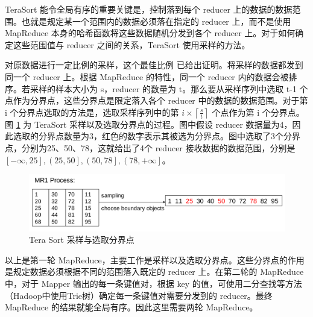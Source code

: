 TeraSort 能令全局有序的重要关键是，控制落到每个 reducer 上的数据的数据范围。也就是规定某一个范围内的数据必须落在指定的 reducer 上，而不是使用 MapReduce 本身的哈希函数将这些数据随机分发到各个 reducer 上。对于如何确定这些范围值与 reducer 之间的关系，TeraSort 使用采样的方法。

对原数据进行一定比例的采样，这个最佳比例 \cite{tao2013minimal} 已给出证明。将采样的数据都发到同一个 reducer 上。根据 MapReduce 的特性，同一个 reducer 内的数据会被排序。若采样的样本大小为 s，reducer 的数量为 t。那么要从采样序列中选取 t-1 个点作为分界点，这些分界点是限定落入各个 reducer 中的数据的数据范围。对于第 i 个分界点选取的方法是，选取采样序列中的第 $i\times \left \lceil \frac{s}{t} \right \rceil$ 个点作为第 i 个分界点。图 \ref{tera_sort_mr1} 为  TeraSort 采样以及选取分界点的过程。图中假设 reducer 数据量为4，因此选取的分界点数量为3，红色的数字表示其被选为分界点。图中选取了3个分界点，分别为25、50、78，这就给出了4个 reducer 接收数据的数据范围，分别是$\left[- \infty, 25 \right], \left(25, 50 \right], \left(50, 78 \right], \left(78, +\infty \right]$。

\begin{figure}[!htb] 
\centering\includegraphics[width=6in]{picture/ch_terasort_mr/tera_sort_mr1} 
\caption{Tera Sort 采样与选取分界点}\label{tera_sort_mr1} 
\end{figure}

以上是第一轮 MapReduce，主要工作是采样以及选取分界点。这些分界点的作用是规定数据必须根据不同的范围落入既定的 reducer 上。在第二轮的 MapReduce 中，对于 Mapper 输出的每一条键值对，根据 key 的值，可使用二分查找等方法（Hadoop中使用Trie树）确定每一条键值对需要分发到的 reducer。最终 MapReduce 的结果就能全局有序。因此这里需要两轮 MapReduce。
